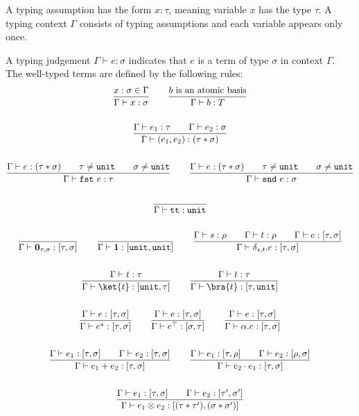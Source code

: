 \begin{definition}
  A typing assumption has the form $x : \tau$, meaning variable $x$ has the type $\tau$. A typing context $\Gamma$ consists of typing assumptions and each variable appears only once.

  A typing judgement $\Gamma \vdash e : \sigma$ indicates that $e$ is a term of type $\sigma$ in context $\Gamma$. The well-typed terms are defined by the following rules:
  \begin{gather*}
    \frac{x : \sigma \in \Gamma}{\Gamma \vdash x : \sigma}
    \qquad 
    \frac{b\ \textrm{is an atomic basis}}{\Gamma \vdash b : T}\\
    \\
    \frac{\Gamma \vdash e_1 : \tau \qquad \Gamma \vdash e_2 : \sigma}{\Gamma \vdash (e_1, e_2) : ( \tau * \sigma )} \\
    \\
    \frac{\Gamma \vdash e : ( \tau * \sigma ) \qquad \tau \neq \unit \qquad \sigma \neq \unit}{\Gamma \vdash \fst\ e : \tau}
    \qquad
    \frac{\Gamma \vdash e : ( \tau * \sigma ) \qquad \tau \neq \unit \qquad \sigma \neq \unit}{\Gamma \vdash \snd\ e : \sigma} \\
    \\
    \frac{}{\Gamma \vdash \utt : \unit}\\
    \ \\
    \frac{}{\Gamma \vdash \mathbf{0}_{\tau, \sigma} : [\tau, \sigma]}
    \qquad
    \frac{}{\Gamma \vdash \mathbf{1} : [\unit, \unit]}
    \qquad
    \frac{\Gamma \vdash s : \rho \qquad \Gamma \vdash t : \rho \qquad \Gamma \vdash e : [\tau, \sigma]}{\Gamma \vdash \delta_{s, t}.e : [\tau, \sigma]}\\
    \ \\
    \frac{\Gamma \vdash t : \tau}{\Gamma \vdash \ket{t} : [\unit, \tau]}
    \qquad 
    \frac{\Gamma \vdash t : \tau}{\Gamma \vdash \bra{t} : [\tau, \unit]}\\
    \ \\
    \frac{\Gamma \vdash e : [\tau, \sigma]}{\Gamma \vdash e^* : [\tau, \sigma]}
    \qquad
    \frac{\Gamma \vdash e : [\tau, \sigma]}{\Gamma \vdash e^\top : [\sigma, \tau]} 
    \qquad
    \frac{\Gamma \vdash e : [\tau, \sigma]}{\Gamma \vdash \alpha.e : [\tau, \sigma]}\\
    \ \\
    \frac{\Gamma \vdash e_1 : [\tau, \sigma] \qquad \Gamma \vdash e_2 : [\tau, \sigma] }{\Gamma \vdash e_1 + e_2 : [\tau, \sigma] }
    \qquad 
    \frac{\Gamma \vdash e_1 : [\tau, \rho] \qquad \Gamma \vdash e_2 : [\rho, \sigma] }{\Gamma \vdash e_2 \cdot e_1 : [\tau, \sigma] } \\
    \ \\
    \frac{\Gamma \vdash e_1 : [\tau, \sigma] \qquad \Gamma \vdash e_2 : [\tau', \sigma'] }{\Gamma \vdash e_1 \otimes e_2 : [(\tau * \tau'), (\sigma * \sigma')]}
  \end{gather*}
\end{definition}

